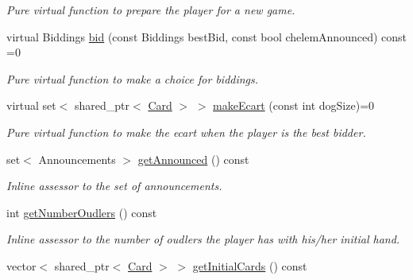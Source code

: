 \begin{DoxyCompactItemize}
\begin{DoxyCompactList}\small\item\em \-Pure virtual function to prepare the player for a new game. \end{DoxyCompactList}\item 
virtual \-Biddings \hyperlink{classPlayer_a4bb658ca7b46f32a42578b884ad7fe82}{bid} (const \-Biddings best\-Bid, const bool chelem\-Announced) const =0
\begin{DoxyCompactList}\small\item\em \-Pure virtual function to make a choice for biddings. \end{DoxyCompactList}\item 
virtual set$<$ shared\-\_\-ptr$<$ \hyperlink{classCard}{\-Card} $>$ $>$ \hyperlink{classPlayer_a34c9e9f402c6a68d6e16caebdb93a33f}{make\-Ecart} (const int dog\-Size)=0
\begin{DoxyCompactList}\small\item\em \-Pure virtual function to make the ecart when the player is the best bidder. \end{DoxyCompactList}\item 
\hypertarget{classPlayer_a5573dd91ddb6fa8874d5a7f7a186f186}{set$<$ \-Announcements $>$ \hyperlink{classPlayer_a5573dd91ddb6fa8874d5a7f7a186f186}{get\-Announced} () const }\label{classPlayer_a5573dd91ddb6fa8874d5a7f7a186f186}

\begin{DoxyCompactList}\small\item\em \-Inline assessor to the set of announcements. \end{DoxyCompactList}\item 
\hypertarget{classPlayer_a4dc51cf2a773556eb26f3d47c4274b0a}{int \hyperlink{classPlayer_a4dc51cf2a773556eb26f3d47c4274b0a}{get\-Number\-Oudlers} () const }\label{classPlayer_a4dc51cf2a773556eb26f3d47c4274b0a}

\begin{DoxyCompactList}\small\item\em \-Inline assessor to the number of oudlers the player has with his/her initial hand. \end{DoxyCompactList}\item 
\hypertarget{classPlayer_aab2cfa2ce2e7a3903ff99ac5c7ef8db6}{vector$<$ shared\-\_\-ptr$<$ \hyperlink{classCard}{\-Card} $>$ $>$ \hyperlink{classPlayer_aab2cfa2ce2e7a3903ff99ac5c7ef8db6}{get\-Initial\-Cards} () const }\label{classPlayer_aab2cfa2ce2e7a3903ff99ac5c7ef8db6}


\end{DoxyCompactItemize}
